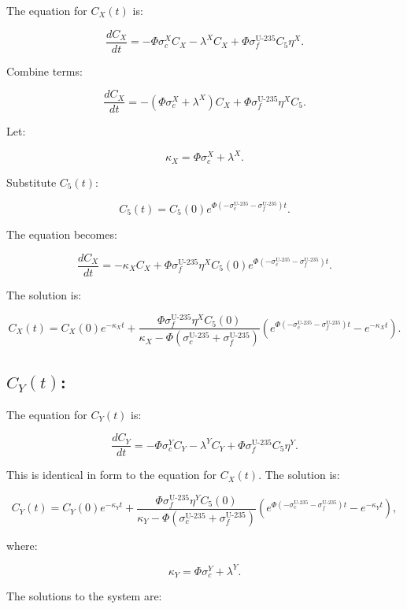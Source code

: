 \documentclass[11pt,a4paper]{article}
\begin{document}
The equation for \(C_X(t)\) is:

\[
\frac{dC_X}{dt} = -\Phi \sigma_c^X C_X - \lambda^X C_X + \Phi \sigma_f^{\text{U-235}} C_5 \eta^X.
\]

Combine terms:

\[
\frac{dC_X}{dt} = -\left(\Phi \sigma_c^X + \lambda^X\right) C_X + \Phi \sigma_f^{\text{U-235}} \eta^X C_5.
\]

Let:

\[
\kappa_X = \Phi \sigma_c^X + \lambda^X.
\]

Substitute \(C_5(t)\):

\[
C_5(t) = C_5(0) e^{\Phi \left(-\sigma_c^{\text{U-235}} - \sigma_f^{\text{U-235}}\right) t}.
\]

The equation becomes:

\[
\frac{dC_X}{dt} = -\kappa_X C_X + \Phi \sigma_f^{\text{U-235}} \eta^X C_5(0) e^{\Phi \left(-\sigma_c^{\text{U-235}} - \sigma_f^{\text{U-235}}\right) t}.
\]

The solution is:

\[
C_X(t) = C_X(0) e^{-\kappa_X t} + \frac{\Phi \sigma_f^{\text{U-235}} \eta^X C_5(0)}{\kappa_X - \Phi \left(\sigma_c^{\text{U-235}} + \sigma_f^{\text{U-235}}\right)} \left(e^{\Phi \left(-\sigma_c^{\text{U-235}} - \sigma_f^{\text{U-235}}\right) t} - e^{-\kappa_X t}\right).
\]

\subsection*{\(C_Y(t)\):}

The equation for \(C_Y(t)\) is:

\[
\frac{dC_Y}{dt} = -\Phi \sigma_c^Y C_Y - \lambda^Y C_Y + \Phi \sigma_f^{\text{U-235}} C_5 \eta^Y.
\]

This is identical in form to the equation for \(C_X(t)\). The solution is:

\[
C_Y(t) = C_Y(0) e^{-\kappa_Y t} + \frac{\Phi \sigma_f^{\text{U-235}} \eta^Y C_5(0)}{\kappa_Y - \Phi \left(\sigma_c^{\text{U-235}} + \sigma_f^{\text{U-235}}\right)} \left(e^{\Phi \left(-\sigma_c^{\text{U-235}} - \sigma_f^{\text{U-235}}\right) t} - e^{-\kappa_Y t}\right),
\]

where:

\[
\kappa_Y = \Phi \sigma_c^Y + \lambda^Y.
\]

The solutions to the system are:
\end{document}
